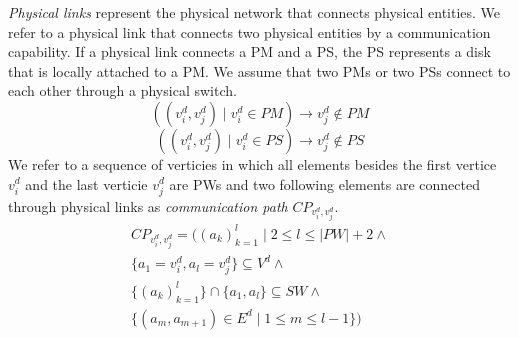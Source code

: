 \documentclass[conference]{IEEEtran}
\begin{document}
\textit{Physical links} represent the physical network that connects physical entities. We refer to a physical link that connects two physical entities by a communication capability.
If a physical link connects a PM and a PS, the PS represents a disk that is locally attached to a PM. We assume that two PMs or two PSs connect to each other through a physical switch.
\begin{equation}
( (v^{d}_i, v^{d}_j) \mid v^{d}_i \in PM ) \rightarrow v^{d}_j \notin PM 
\end{equation}
\begin{equation}
( (v^{d}_i, v^{d}_j) \mid v^{d}_i \in PS ) \rightarrow v^{d}_j \notin PS 
\end{equation}
We refer to a sequence of verticies in which all elements besides the first vertice $v^{d}_i$ and the last verticie $v^{d}_{j}$ are PWs and two following elements are connected through physical links as \textit{communication path} $CP_{v^{d}_i, v^{d}_j}$.
\begin{multline}
CP_{v^{d}_i, v^{d}_j} = ( (a_k)^l_{k=1} \mid 2 \leq l \leq \left\vert PW \right\vert + 2 \wedge \\ \{ a_1=v^{d}_i, a_l=v^{d}_j \} \subseteq V^{d} \wedge \\ \{(a_k)^{l}_{k=1}\} \cap \{a_1, a_l\} \subseteq SW \wedge \\ \{( a_m, a_{m+1} ) \in E^{d} \mid 1 \leq m \leq l-1 \} )
\end{multline}

\end{document}
